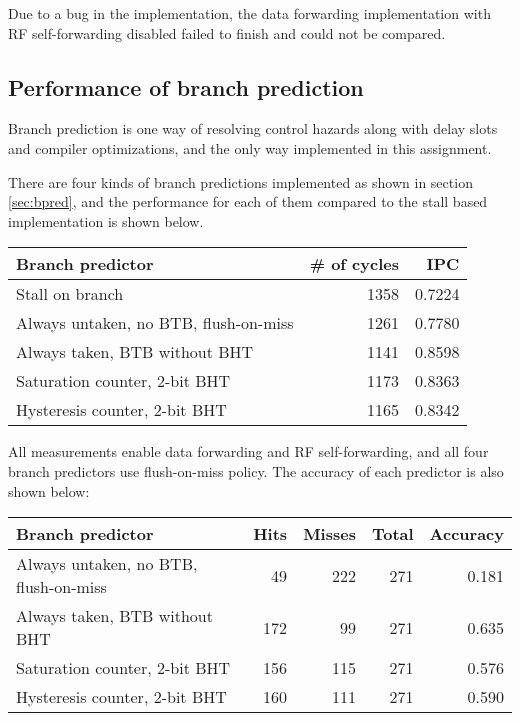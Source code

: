 \documentclass[12pt]{article}
\begin{document}
Due to a bug in the implementation, the data forwarding implementation
with RF self-forwarding disabled failed to finish and could not be
compared.

\subsection{Performance of branch prediction}

Branch prediction is one way of resolving control hazards along with
delay slots and compiler optimizations, and the only way implemented
in this assignment.

There are four kinds of branch predictions implemented as shown in
section \ref{sec:bpred}, and the performance for each of them compared
to the stall based implementation is shown below.

\begin{table}[ht]
  \centering
  \begin{tabular}{@{}lrr@{}} \toprule
    Branch predictor & \# of cycles & IPC \\ \midrule
    Stall on branch & 1358 & 0.7224 \\
    Always untaken, no BTB, flush-on-miss & 1261 & 0.7780 \\
    Always taken, BTB without BHT & 1141 & 0.8598 \\
    Saturation counter, 2-bit BHT & 1173 & 0.8363 \\
    Hysteresis counter, 2-bit BHT & 1165 & 0.8342 \\
    \bottomrule
  \end{tabular}
\end{table}

All measurements enable data forwarding and RF self-forwarding, and
all four branch predictors use flush-on-miss policy.  The accuracy of
each predictor is also shown below:

\begin{table}[ht]
  \centering
  \begin{tabular}{@{}lrrrr@{}} \toprule
    Branch predictor & Hits & Misses & Total & Accuracy \\ \midrule
    Always untaken, no BTB, flush-on-miss & 49 & 222 & 271 & 0.181 \\
    Always taken, BTB without BHT & 172 & 99 & 271  & 0.635 \\
    Saturation counter, 2-bit BHT & 156 & 115 & 271 & 0.576 \\
    Hysteresis counter, 2-bit BHT & 160 & 111 & 271 & 0.590 \\
    \bottomrule
  \end{tabular}
\end{table}
\end{document}
